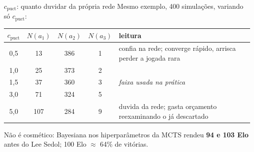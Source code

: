 \documentclass[aspectratio=169, 10pt]{beamer}
\newcommand{\cpuct}{c_{\mathrm{puct}}}
\newcommand{\Nvis}{N}
\begin{document}
\begin{frame}{$\cpuct$: quanto duvidar da própria rede}
  \small
  Mesmo exemplo, 400 simulações, variando só $\cpuct$:

  \medskip
  \centering
  \begin{tabular}{cccc l}
    \toprule
    $\cpuct$ & $\Nvis(a_1)$ & $\Nvis(a_2)$ & $\Nvis(a_3)$ & leitura \\
    \midrule
    0,5 & 13  & 386 & 1 & confia na rede; converge rápido, arrisca perder a jogada rara \\
    1,0 & 25  & 373 & 2 & \\
    1,5 & 37  & 360 & 3 & \emph{faixa usada na prática} \\
    3,0 & 71  & 324 & 5 & \\
    5,0 & 107 & 284 & 9 & duvida da rede; gasta orçamento reexaminando o já descartado \\
    \bottomrule
  \end{tabular}

  \medskip
  \begin{ideiabox}
    Não é cosmético: Bayesiana nos hiperparâmetros da MCTS rendeu \textbf{94 e 103 Elo} antes do Lee Sedol; 100 Elo $\approx$ 64\% de vitórias.
  \end{ideiabox}
\end{frame}
\end{document}
